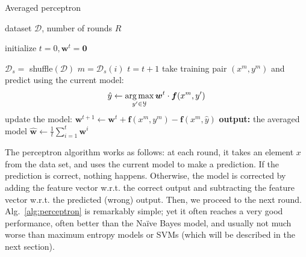 \begin{algorithm}[t]

   \caption{\label{alg:perceptron} Averaged perceptron}

\begin{algorithmic}[1]

    dataset $\mathcal{D}$, number of rounds $R$

   \STATE initialize $t = 0, \boldsymbol{w}^t = \mathbf{0}$

         \STATE $\mathcal{D}_s =$ shuffle$(\mathcal{D})$
	\STATE $m = \mathcal{D}_s(i)$
        \STATE $t = t+1$
	\STATE take training pair $(x^m, y^m)$ and predict using the current model: 
	$$\hat{y}  \leftarrow \operatorname*{arg\,max}_{y'\in\mathcal{Y}} \boldsymbol{w}^t \cdot \boldsymbol{f}(x^m,y')$$
	\STATE update the model: 
	$\boldsymbol{w}^{t+1} \leftarrow \boldsymbol{w}^{t} +
        \boldsymbol{f}(x^m,y^m) - \boldsymbol{f}(x^m,\hat{y})$
        \ENDFOR
	\ENDFOR
   \STATE \textbf{output:} the averaged model $\hat{\boldsymbol{w}} \leftarrow \frac{1}{t}\sum_{i=1}^{t} \boldsymbol{w}^i$

\end{algorithmic}
 
%
%
%
%
%

\end{algorithm}

The perceptron algorithm works as follows: at each round, it takes an element $x$ from the data set, and uses the current model 
to make a prediction. If the prediction is correct, nothing happens. 
Otherwise, the model is corrected by adding the feature vector w.r.t. the correct output and 
subtracting the  feature vector w.r.t. the predicted (wrong) output. Then, we proceed to the next round. 
Alg.~\ref{alg:perceptron} is remarkably simple; yet it often reaches a very good performance, 
often better than the Na\"ive Bayes model, and usually not much worse than maximum entropy models or SVMs (which will be 
described in the next section). 


